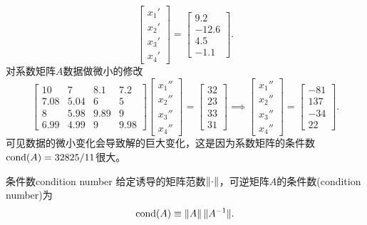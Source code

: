 \begin{example}
\[\begin{bmatrix}
            x_1'\\x_2'\\x_3'\\x_4'
        \end{bmatrix}=\begin{bmatrix}
            9.2\\-12.6\\4.5\\-1.1
        \end{bmatrix}.
    \]
    对系数矩阵$A$数据做微小的修改
    \[
        \begin{bmatrix}
            10&7&8.1&7.2\\
            7.08&5.04&6&5\\
            8&5.98&9.89&9\\
            6.99&4.99&9&9.98
        \end{bmatrix}\begin{bmatrix}
            x_1''\\x_2''\\x_3''\\x_4''
        \end{bmatrix}=\begin{bmatrix}
            32\\23\\33\\31
        \end{bmatrix}\implies\begin{bmatrix}
            x_1''\\x_2''\\x_3''\\x_4''
        \end{bmatrix}=\begin{bmatrix}
            -81\\137\\-34\\22
        \end{bmatrix}.
    \]
    可见数据的微小变化会导致解的巨大变化，这是因为系数矩阵的条件数$\operatorname{cond}(A)=32825/11$很大。
\end{example}

\begin{definition}
    {条件数}{condition number}
    给定诱导的矩阵范数$\left\lVert\cdot\right\rVert$，可逆矩阵$A$的条件数(condition number)为
    \begin{equation}
        \operatorname{cond}(A)\equiv\left\lVert A\right\rVert\lVert A^{-1}\rVert.
    \end{equation}
\end{definition}

